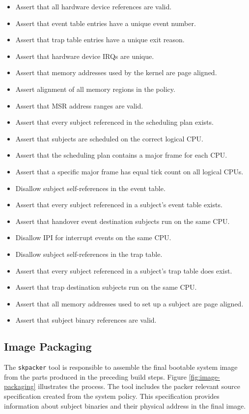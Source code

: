 \begin{itemize}
	\item Assert that all hardware device references are valid.
	\item Assert that event table entries have a unique event number.
	\item Assert that trap table entries have a unique exit reason.
	\item Assert that hardware device IRQs are unique.
	\item Assert that memory addresses used by the kernel are page aligned.
	\item Assert alignment of all memory regions in the policy.
	\item Assert that MSR address ranges are valid.
	\item Assert that every subject referenced in the scheduling plan exists.
	\item Assert that subjects are scheduled on the correct logical CPU.
	\item Assert that the scheduling plan contains a major frame for each CPU.
	\item Assert that a specific major frame has equal tick count on all logical
		CPUs.
	\item Disallow subject self-references in the event table.
	\item Assert that every subject referenced in a subject's event table exists.
	\item Assert that handover event destination subjects run on the same CPU.
	\item Disallow IPI for interrupt events on the same CPU.
	\item Disallow subject self-references in the trap table.
	\item Assert that every subject referenced in a subject's trap table does
		exist.
	\item Assert that trap destination subjects run on the same CPU.
	\item Assert that all memory addresses used to set up a subject are page
		aligned.
	\item Assert that subject binary references are valid.
\end{itemize}

\subsection{Image Packaging}\label{subsec:image-packaging}
The \texttt{skpacker} tool is responsible to assemble the final bootable system
image from the parts produced in the preceding build steps. Figure
\ref{fig:image-packaging} illustrates the process. The tool includes the packer
relevant source specification created from the system policy. This specification
provides information about subject binaries and their physical address in the
final image.

